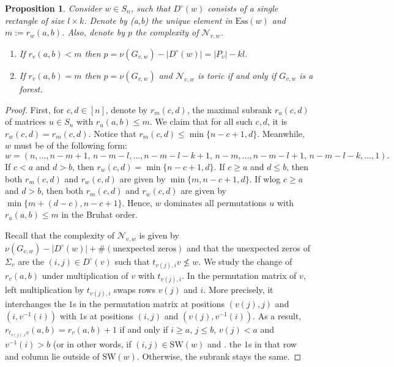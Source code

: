 \documentclass[11pt]{amsart}
\newtheorem{proposition}[theorem]{Proposition}
\theoremstyle{definition}
\theoremstyle{definition}
\theoremstyle{definition}
\theoremstyle{definition}
\newcommand{\SW}{\mathrm{SW}}
\newcommand{\Ess}{\mathrm{Ess}}
\newcommand{\Gvwt}{G_{v,w}}
\newcommand{\Nvw}{\mathcal{N}_{v,w}}
\newcommand{\Dc}{D^{\circ}}
\newcommand{\cn}{\nu}
\newcommand{\rk}{r}
\begin{document}
\begin{proposition}\label{prop: rectangle comp}
    Consider $w\in S_n$, such that $\Dc(w)$ consists of a single rectangle of size $l \times k$. Denote by (a,b) the unique element in $\Ess(w)$ and $m := r_w(a,b)$. Also, denote by $p$ the complexity of $\Nvw$.
    \begin{enumerate}
        \item If $\rk_v(a,b) < m$ then $p= \cn(\Gvwt) - |\Dc(w)| =  |P_v|- kl$. 
        \item If $\rk_v(a,b) =m$ then $p = \cn(\Gvwt)$ and $\Nvw$ is toric if and only if $\Gvwt$ is a forest.
    \end{enumerate}
    \end{proposition}
    \begin{proof}
     First, for $c,d \in [n]$, denote by $\rk_m(c,d)$, the maximal subrank $\rk_u(c,d)$ of matrices $u \in S_n$ with $\rk_u(a,b) \leq m$. We claim that for all such $c,d$, it is $\rk_w(c,d) = \rk_m(c,d)$. Notice that $\rk_m(c,d) \leq \min \{ n-c+1,d \}$. Meanwhile, $w$ must be of the following form:
     $$
    w= (n, \ldots, n-m+1, \, n-m-l, \ldots, n-m-l-k+1, \, n-m, \ldots, n-m-l+1, \, n-m-l-k, \ldots, 1).
$$
     If $c<a$ and $d>b$, then $\rk_w(c,d) = \min \{n-c+1,d \}$. If $c \geq a$ and $d \leq b$, then both $\rk_m(c,d)$ and $\rk_w(c,d)$ are given by $\min \{ m, n-c+1, d \}$.
     If wlog $c \geq a$ and $d>b$, then both $\rk_m(c,d)$ and $\rk_w(c,d)$ are given by $\min \{ m+(d-c), n-c+1 \}$.
     Hence, $w$ dominates all permutations $u$ with $\rk_u(a,b) \leq m$ in the Bruhat order. 
     
    \noindent
    Recall that the complexity of $\Nvw$ is given by $\cn(\Gvwt) - |\Dc(w)| + \# (\textrm{unexpected zeros})$ and that the unexpected zeros of $\Sigma_v$ are the $(i,j) \in \Dc(v)$ such that $t_{v(j),i}v \not\leq w$. We study the change of $\rk_v(a,b)$ under multiplication of $v$ with $t_{v(j),i}$. In the permutation matrix of $v$, left multiplication by $t_{v(j),i}$ swaps rows $v(j)$ and $i$. More precisely, it interchanges the $1$s in the permutation matrix at positions $(v(j),j)$ and $(i, v^{-1}(i))$ with $1$s at positions $(i,j)$ and $(v(j), v^{-1}(i))$. As a result, $\rk_{t_{v(j),i}v}(a,b) = \rk_v(a,b) +1$ if and only if $i \geq a$, $j \leq b$, $v(j)<a$ and $v^{-1}(i) >b$ (or in other words, if $(i,j) \in \SW(w)$ and . 
    the $1$s in that row and column lie outside of $\SW(w)$.
    Otherwise, the subrank stays the same. 


\end{proof}
\end{document}
